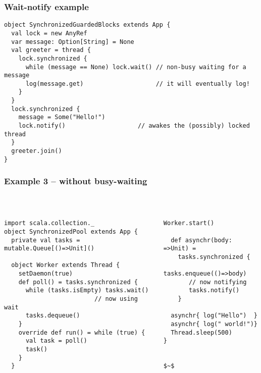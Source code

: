 \documentclass[aspectratio=169]{beamer}
\begin{document}
\begin{frame}[fragile]\frametitle{Wait-notify example}
\begin{lstlisting}[emph={sleep,log,thread,join,wait,notify}]
object SynchronizedGuardedBlocks extends App {
  val lock = new AnyRef
  var message: Option[String] = None
  val greeter = thread {
    lock.synchronized {
      while (message == None) lock.wait() // non-busy waiting for a message
      log(message.get)                    // it will eventually log!
    }
  }
  lock.synchronized {
    message = Some("Hello!")
    lock.notify()                    // awakes the (possibly) locked thread
  }
  greeter.join()
}
\end{lstlisting}
\end{frame}


\begin{frame}[fragile]\frametitle{Example 3 -- without busy-waiting}
~\\[-8mm]
\begin{columns}
\begin{column}{0.65\textwidth}
\begin{lstlisting}[emph={printUniqueIds,sleep,log,thread,join,synchronized,wait,notify}]
import scala.collection._
object SynchronizedPool extends App {
  private val tasks = mutable.Queue[()=>Unit]()

  object Worker extends Thread {
    setDaemon(true)
    def poll() = tasks.synchronized {
      while (tasks.isEmpty) tasks.wait()
                         // now using wait
      tasks.dequeue()
    }
    override def run() = while (true) {
      val task = poll()
      task()
    }
  }
\end{lstlisting}
\end{column}
\begin{column}{0.40\textwidth}
\begin{lstlisting}[emph={sleep,log,thread,join,synchronized,wait,notify}]
  Worker.start()

  def asynchr(body: =>Unit) =
    tasks.synchronized {
       tasks.enqueue(()=>body)
       // now notifying
       tasks.notify()
    }

  asynchr{ log("Hello")  }
  asynchr{ log(" world!")}
  Thread.sleep(500)
}


$~$
\end{lstlisting}
\end{column}
\end{columns}


\end{frame}
\end{document}
